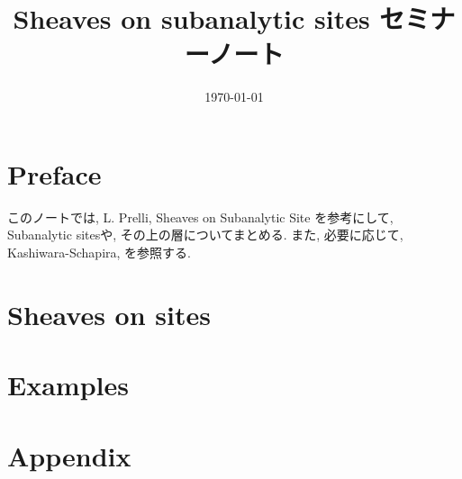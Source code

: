 \documentclass[nomag*,a4paper,leqno,uplatex]{jsarticle}
\title{\vspace{-2.5em}Sheaves on subanalytic sites セミナーノート\vspace{-1em}}
\date{\vspace{-1em}\today\vspace{-1.5em}}
\numberwithin{thm}{subsection}
\numberwithin{equation}{subsection}
\begin{document}
\maketitle
\tableofcontents
\addtocounter{section}{-1}
\section{Preface}
このノートでは,
L. Prelli,
Sheaves on Subanalytic Site \cite{book:Prelli}
を参考にして,
Subanalytic sitesや,
その上の層についてまとめる.
また, 必要に応じて,
Kashiwara-Schapira\cite{book:KS_sh}, \cite{book:KS_cat}
を参照する.

\section{Sheaves on sites}

\section{Examples}

\section{Appendix}


\end{document}
